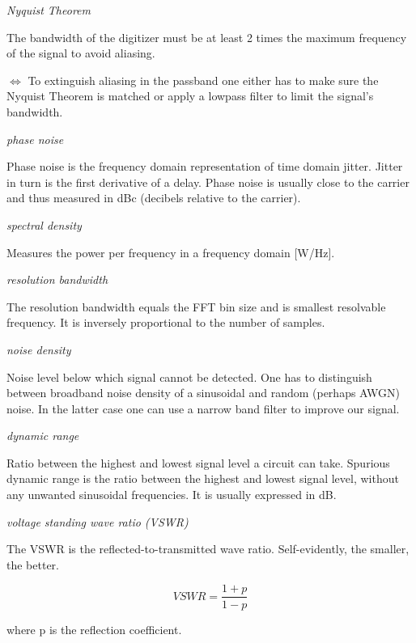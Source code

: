\documentclass{article}
\begin{document}
\emph{Nyquist Theorem}

The bandwidth of the digitizer must be at least 2 times the maximum frequency of the signal to avoid aliasing. 

\medskip

$\Leftrightarrow$ To extinguish aliasing in the passband one either has to make sure the Nyquist Theorem is matched or apply a lowpass filter to limit the signal's bandwidth.

\bigskip

\emph{phase noise}

Phase noise is the frequency domain representation of time domain jitter. Jitter in turn is the first derivative of a delay. Phase noise is usually close to the carrier and thus measured in dBc (decibels relative to the carrier).

\bigskip

\emph{spectral density}

Measures the power per frequency in a frequency domain [W/Hz].

\bigskip

\emph{resolution bandwidth}

The resolution bandwidth equals the FFT bin size and is smallest resolvable frequency. It is inversely proportional to the number of samples.

\bigskip

\emph{noise density}

Noise level below which signal cannot be detected. One has to distinguish between broadband noise density of a sinusoidal and random (perhaps AWGN) noise. In the latter case one can use a narrow band filter to improve our signal. 

\bigskip

\emph{dynamic range}

Ratio between the highest and lowest signal level a circuit can take. Spurious dynamic range is the ratio between the highest and lowest signal level, without any unwanted sinusoidal frequencies. It is usually expressed in dB.

\bigskip

\emph{voltage standing wave ratio (VSWR)}

The VSWR is the reflected-to-transmitted wave ratio. Self-evidently, the smaller, the better.

$$
	VSWR = \frac{1+p}{1-p}
$$

where p is the reflection coefficient.

\medskip
\end{document}
